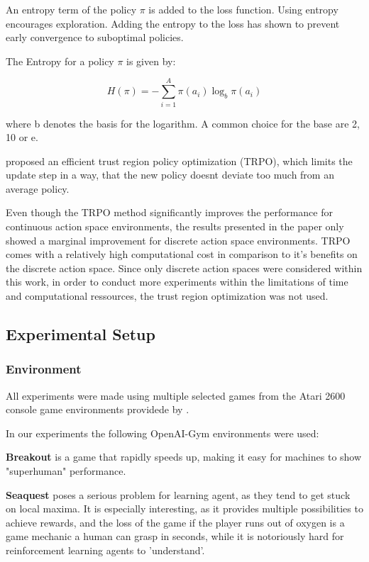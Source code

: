 An entropy term of the policy $\pi$ is added to the loss function.
Using entropy encourages exploration. Adding the entropy to the loss has shown to prevent early convergence to suboptimal policies.

The Entropy for a policy $\pi$ is given by:

\begin{equation}
H(\pi) = -\sum^A_{i=1} \pi(a_i)\log_b \pi(a_i)
\end{equation}

where b denotes the basis for the logarithm. A common choice for the  base are 2, 10 or e. \citep{entropy}

\citet{ACER} proposed an efficient trust region policy optimization (TRPO), which limits the update step in a way, that the new policy doesnt deviate too much from an average policy. 

Even though the TRPO method significantly improves the performance for continuous action space environments, the results presented in the paper only showed a marginal improvement for discrete action space environments.
TRPO comes with a relatively high computational cost in comparison to it's benefits on the discrete action space.
Since only discrete action spaces were considered within this work, in order to conduct more experiments within the limitations of time and computational ressources, the trust region optimization was not used.

\subsection{Experimental Setup}

\subsubsection{Environment}
All experiments were made using multiple selected games from the Atari 2600 console game environments providede by \citet{openaigym}.

In our experiments the following OpenAI-Gym environments were used:

\textbf{Breakout} is a game that rapidly speeds up, making it easy for machines to show "superhuman" performance.

\textbf{Seaquest} poses a serious problem for learning agent, as they tend to get stuck on local maxima. It is especially interesting, as it provides multiple possibilities to achieve rewards, and the loss of the game if the player runs out of oxygen is a game mechanic a human can grasp in seconds, while it is notoriously hard for reinforcement learning agents to 'understand'.

